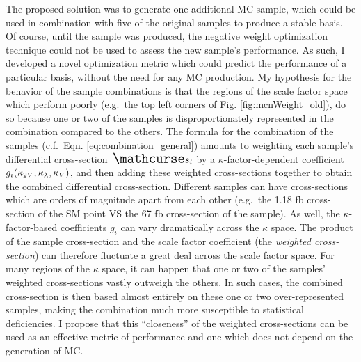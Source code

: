     The proposed solution was to generate one additional MC sample,
        which could be used in combination with five of the original samples to produce a stable basis.
    Of course, until the sample was produced, the negative weight optimization technique could not be used to assess the new sample's performance.
    As such, I developed a novel optimization metric which could predict the performance of a particular basis,
        without the need for any MC production.
    My hypothesis for the behavior of the sample combinations is that the regions of the scale factor space which perform poorly
        (e.g.\ the top left corners of Fig. \ref{fig:mcnWeight_old}),
        do so because one or two of the samples is disproportionately represented in the combination compared to the others.
    The formula for the combination of the samples (c.f.\ Eqn. \ref{eq:combination_general}) amounts to
        weighting each sample's differential cross-section $\xsec_i$ by a $\kappa$-factor-dependent coefficient $g_i(\kappa_{2V},\kappa_{\lambda},\kappa_{V})$,
        and then adding these weighted cross-sections together to obtain the combined differential cross-section.
    Different samples can have cross-sections which are orders of magnitude apart from each other
        (e.g.\ the 1.18 fb cross-section of the SM point VS the 67 fb cross-section of the  sample).
    As well, the $\kappa$-factor-based coefficients $g_i$ can vary dramatically across the $\kappa$ space.
    The product of the sample cross-section and the scale factor coefficient (the \textit{weighted cross-section})
        can therefore fluctuate a great deal across the scale factor space.
    For many regions of the $\kappa$ space, it can happen that one or two of the samples' weighted cross-sections vastly outweigh the others.
    In such cases, the combined cross-section is then based almost entirely on these one or two over-represented samples,
        making the combination much more susceptible to statistical deficiencies.
    I propose that this ``closeness'' of the weighted cross-sections can be used as an effective metric of performance
        and one which does not depend on the generation of MC.

